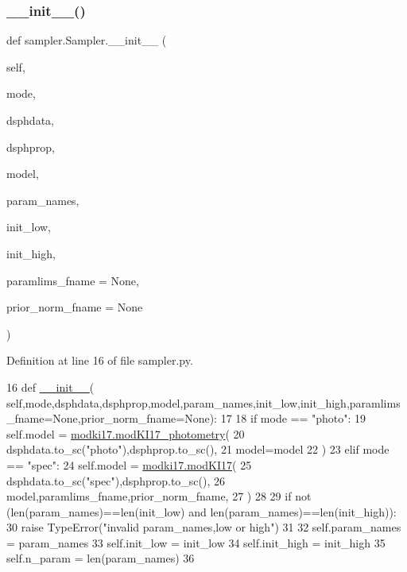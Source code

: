 \subsubsection{\texorpdfstring{\+\_\+\+\_\+init\+\_\+\+\_\+()}{\_\_init\_\_()}}
{\footnotesize\ttfamily def sampler.\+Sampler.\+\_\+\+\_\+init\+\_\+\+\_\+ (\begin{DoxyParamCaption}\item[{}]{self,  }\item[{}]{mode,  }\item[{}]{dsphdata,  }\item[{}]{dsphprop,  }\item[{}]{model,  }\item[{}]{param\+\_\+names,  }\item[{}]{init\+\_\+low,  }\item[{}]{init\+\_\+high,  }\item[{}]{paramlims\+\_\+fname = {\ttfamily None},  }\item[{}]{prior\+\_\+norm\+\_\+fname = {\ttfamily None} }\end{DoxyParamCaption})}



Definition at line 16 of file sampler.\+py.


\begin{DoxyCode}
16     \textcolor{keyword}{def }\hyperlink{classsampler_1_1Sampler_a0ebbb93e5c948bc426658cbdc92bfd12}{\_\_init\_\_}(
      self,mode,dsphdata,dsphprop,model,param\_names,init\_low,init\_high,paramlims\_fname=None,prior\_norm\_fname=None):
17         
18         \textcolor{keywordflow}{if} mode == \textcolor{stringliteral}{"photo"}:
19             self.model = \hyperlink{classmodki17_1_1modKI17__photometry}{modki17.modKI17\_photometry}(
20                 dsphdata.to\_sc(\textcolor{stringliteral}{"photo"}),dsphprop.to\_sc(),
21                 model=model
22             )
23         \textcolor{keywordflow}{elif} mode == \textcolor{stringliteral}{"spec"}:
24             self.model = \hyperlink{classmodki17_1_1modKI17}{modki17.modKI17}(
25                 dsphdata.to\_sc(\textcolor{stringliteral}{"spec"}),dsphprop.to\_sc(),
26                 model,paramlims\_fname,prior\_norm\_fname,
27             )
28         
29         \textcolor{keywordflow}{if} \textcolor{keywordflow}{not} (len(param\_names)==len(init\_low) \textcolor{keywordflow}{and} len(param\_names)==len(init\_high)):
30             \textcolor{keywordflow}{raise} TypeError(\textcolor{stringliteral}{"invalid param\_names,low or high"})
31         
32         self.param\_names = param\_names
33         self.init\_low = init\_low
34         self.init\_high = init\_high
35         self.n\_param = len(param\_names)
36         
\end{DoxyCode}


